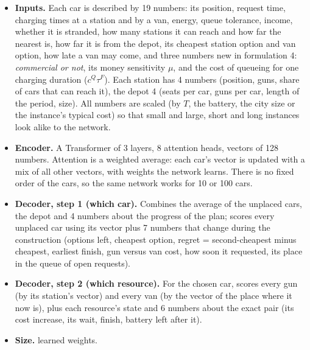 \begin{itemize}
  \item \textbf{Inputs.} Each car is described by 19 numbers: its position, request time, charging times at a station and by a van, energy, queue tolerance, income, whether it is stranded, how many stations it can reach and how far the nearest is, how far it is from the depot, its cheapest station option and van option, how late a van may come, and three numbers new in formulation 4: \emph{commercial or not}, its money sensitivity $\mu$, and the cost of queueing for one charging duration ($c^Q\tau^F$). Each station has 4 numbers (position, guns, share of cars that can reach it), the depot 4 (seats per car, guns per car, length of the period, size). All numbers are scaled (by $T$, the battery, the city size or the instance's typical cost) so that small and large, short and long instances look alike to the network.
  \item \textbf{Encoder.} A Transformer of 3 layers, 8 attention heads, vectors of 128 numbers. Attention is a weighted average: each car's vector is updated with a mix of all other vectors, with weights the network learns. There is no fixed order of the cars, so the same network works for 10 or 100 cars.
  \item \textbf{Decoder, step 1 (which car).} Combines the average of the unplaced cars, the depot and 4 numbers about the progress of the plan; scores every unplaced car using its vector plus 7 numbers that change during the construction (options left, cheapest option, regret = second-cheapest minus cheapest, earliest finish, gun versus van cost, how soon it requested, its place in the queue of open requests).
  \item \textbf{Decoder, step 2 (which resource).} For the chosen car, scores every gun (by its station's vector) and every van (by the vector of the place where it now is), plus each resource's state and 6 numbers about the exact pair (its cost increase, its wait, finish, battery left after it).
  \item \textbf{Size.} \frlParams{} learned weights.
\end{itemize}

